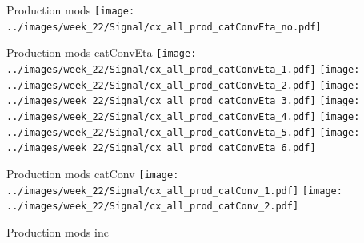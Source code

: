 \documentclass[10pt,UKenglish, leqno, xcolor = dvipsnames]{beamer}
\begin{document}
		\begin{frame}{Production mods}
			\vfill
			\centering
			\texttt{[image: ../images/week\_22/Signal/cx\_all\_prod\_catConvEta\_no.pdf]}
			\vfill
		\end{frame}
		
		\begin{frame}{Production mods catConvEta}
			\vfill
			\centering
			\texttt{[image: ../images/week\_22/Signal/cx\_all\_prod\_catConvEta\_1.pdf]}
			\texttt{[image: ../images/week\_22/Signal/cx\_all\_prod\_catConvEta\_2.pdf]}
			\texttt{[image: ../images/week\_22/Signal/cx\_all\_prod\_catConvEta\_3.pdf]}
			\texttt{[image: ../images/week\_22/Signal/cx\_all\_prod\_catConvEta\_4.pdf]}
			\texttt{[image: ../images/week\_22/Signal/cx\_all\_prod\_catConvEta\_5.pdf]}
			\texttt{[image: ../images/week\_22/Signal/cx\_all\_prod\_catConvEta\_6.pdf]}
			\vfill
		\end{frame}
		
		\begin{frame}{Production mods catConv}
			\vfill
			\centering
			\texttt{[image: ../images/week\_22/Signal/cx\_all\_prod\_catConv\_1.pdf]}
			\texttt{[image: ../images/week\_22/Signal/cx\_all\_prod\_catConv\_2.pdf]}
			\vfill
		\end{frame}
	
		\begin{frame}{Production mods inc}
			\vfill
			\centering
			\begin{table}[tbp]
				\centering
				\caption{abs($C_X^{prod}$ - $C_X^{ggH}$)/$C_X^{ggH}$}
			\end{table}
			\vfill
		\end{frame}
	
\end{document}
